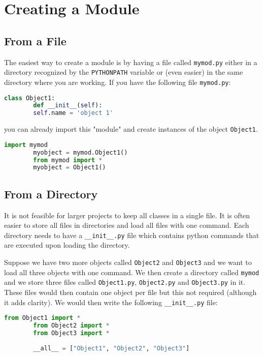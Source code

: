 \documentclass{article}
\begin{document}
	\section{Creating a Module}
	
	\subsection{From a File}
	
	The easiest way to create a module is by having a file called \texttt{mymod.py} either in a directory recognized by the \texttt{PYTHONPATH} variable or (even easier) in the same directory where you are working. If you have the following file \texttt{mymod.py}:
	
	\begin{lstlisting}[language=Python]
		class Object1:
		def __init__(self):
		self.name = 'object 1'
	\end{lstlisting}
	
	you can already import this "module" and create instances of the object \texttt{Object1}.
	
	\begin{lstlisting}[language=Python]
		import mymod
		myobject = mymod.Object1()
		from mymod import *
		myobject = Object1()
	\end{lstlisting}
	
	\subsection{From a Directory}
	
	It is not feasible for larger projects to keep all classes in a single file. It is often easier to store all files in directories and load all files with one command. Each directory needs to have a \texttt{\_\_init\_\_.py} file which contains python commands that are executed upon loading the directory.
	
	Suppose we have two more objects called \texttt{Object2} and \texttt{Object3} and we want to load all three objects with one command. We then create a directory called \texttt{mymod} and we store three files called \texttt{Object1.py}, \texttt{Object2.py} and \texttt{Object3.py} in it. These files would then contain one object per file but this not required (although it adds clarity). We would then write the following \texttt{\_\_init\_\_.py} file:
	
	\begin{lstlisting}[language=Python]
		from Object1 import *
		from Object2 import *
		from Object3 import *
		
		__all__ = ["Object1", "Object2", "Object3"]
	\end{lstlisting}
	
\end{document}
